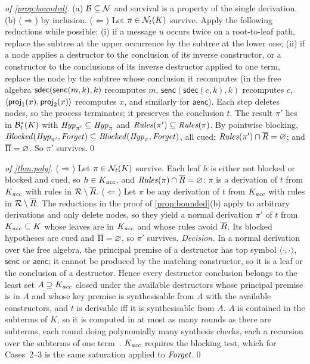 \begin{proof}[of \cref{prop:bounded}]
(a) $\mathcal{B}\subseteq\mathcal{N}$ and survival is a property of the single derivation.
(b) ($\Rightarrow$) by inclusion. ($\Leftarrow$) Let $\pi\in\mathcal{N}_t(K)$ survive. Apply the following reductions while possible: (i) if a message $u$ occurs twice on a root-to-leaf path, replace the subtree at the upper occurrence by the subtree at the lower one; (ii) if a node applies a destructor to the conclusion of its inverse constructor, or a constructor to the conclusions of its inverse destructor applied to one term, replace the node by the subtree whose conclusion it recomputes (in the free algebra $\mathsf{sdec}(\mathsf{senc}(m,k),k)$ recomputes $m$, $\mathsf{senc}(\mathsf{sdec}(c,k),k)$ recomputes $c$, $\langle \mathsf{proj}_1(x),\mathsf{proj}_2(x)\rangle$ recomputes $x$, and similarly for $\mathsf{aenc}$). Each step deletes nodes, so the process terminates; it preserves the conclusion $t$. The result $\pi'$ lies in $\mathcal{B}^*_t(K)$ with $\mathit{Hyp}_{\pi'}\subseteq\mathit{Hyp}_\pi$ and $\mathit{Rules}(\pi')\subseteq\mathit{Rules}(\pi)$. By pointwise blocking, $\mathit{Blocked}(\mathit{Hyp}_{\pi'},\mathit{Forget})\subseteq\mathit{Blocked}(\mathit{Hyp}_\pi,\mathit{Forget})$, all cued; $\mathit{Rules}(\pi')\cap\overline{R}=\varnothing$; and $\overline{\Pi}=\varnothing$. So $\pi'$ survives.\qed
\end{proof}

\begin{proof}[of \cref{thm:poly}]
($\Rightarrow$) Let $\pi\in\mathcal{N}_t(K)$ survive. Each leaf $h$ is either not blocked or blocked and cued, so $h\in K_{\mathit{acc}}$, and $\mathit{Rules}(\pi)\cap\overline{R}=\varnothing$: $\pi$ is a derivation of $t$ from $K_{\mathit{acc}}$ with rules in $\mathcal{R}\setminus\overline{R}$.
($\Leftarrow$) Let $\pi$ be any derivation of $t$ from $K_{\mathit{acc}}$ with rules in $\mathcal{R}\setminus\overline{R}$. The reductions in the proof of \cref{prop:bounded}(b) apply to arbitrary derivations and only delete nodes, so they yield a normal derivation $\pi'$ of $t$ from $K_{\mathit{acc}}\subseteq K$ whose leaves are in $K_{\mathit{acc}}$ and whose rules avoid $\overline{R}$. Its blocked hypotheses are cued and $\overline{\Pi}=\varnothing$, so $\pi'$ survives.
\emph{Decision.} In a normal derivation over the free algebra, the principal premise of a destructor has top symbol $\langle\cdot,\cdot\rangle$, $\mathsf{senc}$ or $\mathsf{aenc}$; it cannot be produced by the matching constructor, so it is a leaf or the conclusion of a destructor. Hence every destructor conclusion belongs to the least set $A\supseteq K_{\mathit{acc}}$ closed under the available destructors whose principal premise is in $A$ and whose key premise is synthesisable from $A$ with the available constructors, and $t$ is derivable iff it is synthesisable from $A$. $A$ is contained in the subterms of $K$, so it is computed in at most as many rounds as there are subterms, each round doing polynomially many synthesis checks, each a recursion over the subterms of one term~\cite{rusinowitch2003protocol}. $K_{\mathit{acc}}$ requires the blocking test, which for Cases~2--3 is the same saturation applied to $\mathit{Forget}$.\qed
\end{proof}

